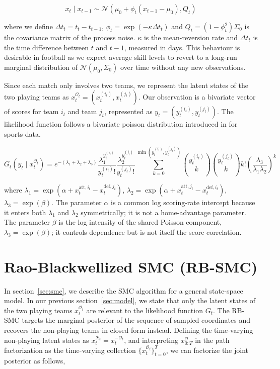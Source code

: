 \begin{equation}
    x_t \mid x_{t-1} \sim \mathcal{N}(\mu_0 + \phi_t (x_{t-1} - \mu_0), Q_t)
\end{equation}

where we define $\Delta t_t = t_t - t_{t-1}$, $\phi_t = \exp(-\kappa \Delta t_t)$ and $Q_t = (1 - \phi_t^2)\Sigma_0$ is the covariance matrix of the process noise. $\kappa$ is the mean-reversion rate and $\Delta t_t$ is the time difference between $t$ and $t-1$, measured in days. This behaviour is desirable in football as we expect average skill levels to revert to a long-run marginal distribution of $\mathcal{N}(\mu_0, \Sigma_0)$ over time without any new observations.

Since each match only involves two teams, we represent the latent states of the two playing teams as $x_t^{\mathcal{O}_t} = (x_t^{(i_t)}, x_t^{(j_t)})$. Our observation is a bivariate vector of scores for team $i_t$ and team $j_t$, represented as $y_t = (y_t^{(i_t)}, y_t^{(j_t)})$. The likelihood function follows a bivariate poisson distribution introduced in \citep{karlisntzoufras2003bivariatepoisson} for sports data.

\begin{equation}
    G_t(y_t \mid x_t^{\mathcal{O}_t}) = e^{-(\lambda_1 + \lambda_2 + \lambda_3)} \frac{\lambda_1^{y_t^{(i_t)}}}{y_t^{(i_t)}!} \frac{\lambda_2^{y_t^{(j_t)}}}{y_t^{(j_t)}!} \sum_{k=0}^{\min(y_t^{(i_t)}, y_t^{(j_t)})} \binom{y_t^{(i_t)}}{k} \binom{y_t^{(j_t)}}{k} k! \left( \frac{\lambda_{3}}{\lambda_1 \lambda_2} \right)^k
\end{equation}

where $\lambda_1 = \exp(\alpha + x_t^{\text{att}, i_t} - x_t^{\text{def}, j_t})$, $\lambda_2 = \exp(\alpha + x_t^{\text{att}, j_t} - x_t^{\text{def}, i_t})$, $\lambda_3 = \exp(\beta)$. The parameter $\alpha$ is a common log scoring-rate intercept because it enters both $\lambda_1$ and $\lambda_2$ symmetrically; it is not a home-advantage parameter. The parameter $\beta$ is the log intensity of the shared Poisson component, $\lambda_3 = \exp(\beta)$; it controls dependence but is not itself the score correlation.

\section{Rao-Blackwellized SMC (RB-SMC)}
\label{sec:rb-smc}
In section~\ref{sec:smc}, we describe the SMC algorithm for a general state-space model. In our previous section~\ref{sec:model}, we state that only the latent states of the two playing teams $x_t^{\mathcal{O}_t}$ are relevant to the likelihood function $G_t$. The RB-SMC targets the marginal posterior of the sequence of sampled coordinates and recovers the non-playing teams in closed form instead. Defining the time-varying non-playing latent states as $x_t^{\mathcal{R}_t} = x_t^{-\mathcal{O}_t}$, and interpreting $x_{0:T}^{\mathcal{O}}$ in the path factorization as the time-varying collection $\{x_t^{\mathcal{O}_t}\}_{t=0}^T$, we can factorize the joint posterior as follows,

